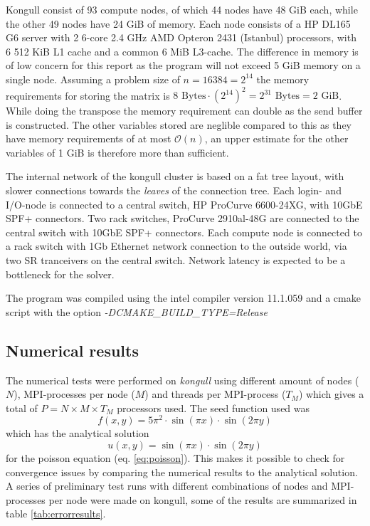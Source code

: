 \documentclass[11pt,a4paper,english]{article}
\numberwithin{figure}{subsection}
\numberwithin{table}{subsection}
\begin{document}
Kongull consist of 93 compute nodes, of which 44 nodes have 48 GiB each, while the other 49 nodes have 24 GiB of memory. Each node consists of a HP DL165 G6 server with 2 6-core 2.4 GHz AMD Opteron 2431 (Istanbul) processors, with 6 512 KiB L1 cache and a common 6 MiB L3-cache. The difference in memory is of low concern for this report as the program will not exceed 5 GiB memory on a single node. Assuming a problem size of $n=16384=2^{14}$ the memory requirements for storing the matrix is $8\text{ Bytes}\cdot (2^{14})^2 = 2^{31} \text{ Bytes} = 2 \text{ GiB}$. While doing the transpose the memory requirement can double as the send buffer is constructed. The other variables stored are neglible compared to this as they have memory requirements of at most $\mathcal{O}(n)$, an upper estimate for the other variables of 1 GiB is therefore more than sufficient.

The internal network of the kongull cluster is based on a fat tree layout, with slower connections towards the \textit{leaves} of the connection tree. Each login- and I/O-node is connected to a central switch, HP ProCurve 6600-24XG, with 10GbE SPF+ connectors. Two rack switches, ProCurve 2910al-48G are connected to the central switch with 10GbE SPF+ connectors. Each compute node is connected to a rack switch with 1Gb Ethernet network connection to the outside world, via two SR tranceivers on the central switch.\cite{kongull}
Network latency is expected to be a bottleneck for the solver.

The program was compiled using the intel compiler version 11.1.059 and a cmake script with the option \textit{-DCMAKE\_BUILD\_TYPE=Release}

\subsection{Numerical results}
The numerical tests were performed on \textit{kongull} using different amount of nodes ($N$), MPI-processes per node ($M$) and threads per MPI-process ($T_M$) which gives a total of $P=N\times M\times T_M$ processors used. The seed function used was
\begin{equation*}
	f(x,y) = 5\pi^2\cdot\sin(\pi x)\cdot\sin(2\pi y)
\end{equation*}
which has the analytical solution
\begin{equation*}
	u(x,y) = \sin(\pi x)\cdot\sin(2\pi y)
\end{equation*}
for the poisson equation (eq. \eqref{eq:poisson}). This makes it possible to check for convergence issues by comparing the numerical results to the analytical solution. A series of preliminary test runs with different combinations of nodes and MPI-processes per node were made on kongull, some of the results are summarized in table \ref{tab:errorresults}. 
\end{document}

